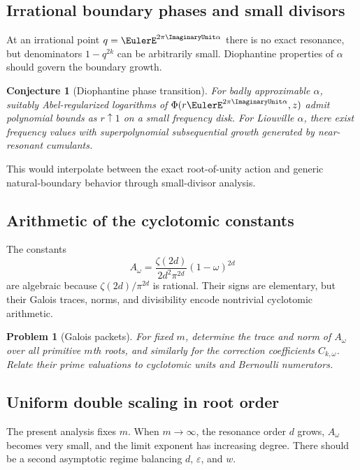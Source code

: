 \documentclass[11pt]{article}
\newtheorem{conjecture}[theorem]{Conjecture}
\newtheorem{problem}[theorem]{Problem}
\theoremstyle{definition}
\newcommand{\eps}{\varepsilon}
\begin{document}
\subsection{Irrational boundary phases and small divisors}

At an irrational point $q=\EulerE^{2\pi\ImaginaryUnit\alpha}$ there is no exact resonance, but denominators $1-q^{2k}$ can be arbitrarily small.  Diophantine properties of $\alpha$ should govern the boundary growth.

\begin{conjecture}[Diophantine phase transition]
For badly approximable $\alpha$, suitably Abel-regularized logarithms of $\Phi(r\EulerE^{2\pi\ImaginaryUnit\alpha},z)$ admit polynomial bounds as $r\uparrow1$ on a small frequency disk.  For Liouville $\alpha$, there exist frequency values with superpolynomial subsequential growth generated by near-resonant cumulants.
\end{conjecture}

This would interpolate between the exact root-of-unity action and generic natural-boundary behavior through small-divisor analysis.

\subsection{Arithmetic of the cyclotomic constants}

The constants
\[
 A_\omega=\frac{\zeta(2d)}{2d^2\pi^{2d}}(1-\omega)^{2d}
\]
are algebraic because $\zeta(2d)/\pi^{2d}$ is rational.  Their signs are elementary, but their Galois traces, norms, and divisibility encode nontrivial cyclotomic arithmetic.

\begin{problem}[Galois packets]
For fixed $m$, determine the trace and norm of $A_\omega$ over all primitive $m$th roots, and similarly for the correction coefficients $C_{k,\omega}$.  Relate their prime valuations to cyclotomic units and Bernoulli numerators.
\end{problem}

\subsection{Uniform double scaling in root order}

The present analysis fixes $m$.  When $m\to\infty$, the resonance order $d$ grows, $A_\omega$ becomes very small, and the limit exponent has increasing degree.  There should be a second asymptotic regime balancing $d$, $\eps$, and $w$.
\end{document}
